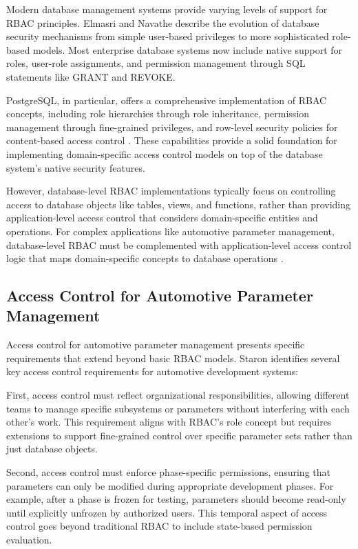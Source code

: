 Modern database management systems provide varying levels of support for RBAC principles. Elmasri and Navathe \cite{elmasri2015fundamentals} describe the evolution of database security mechanisms from simple user-based privileges to more sophisticated role-based models. Most enterprise database systems now include native support for roles, user-role assignments, and permission management through SQL statements like GRANT and REVOKE.

PostgreSQL, in particular, offers a comprehensive implementation of RBAC concepts, including role hierarchies through role inheritance, permission management through fine-grained privileges, and row-level security policies for content-based access control \cite{obe2017postgresql}. These capabilities provide a solid foundation for implementing domain-specific access control models on top of the database system's native security features.

However, database-level RBAC implementations typically focus on controlling access to database objects like tables, views, and functions, rather than providing application-level access control that considers domain-specific entities and operations. For complex applications like automotive parameter management, database-level RBAC must be complemented with application-level access control logic that maps domain-specific concepts to database operations \cite{ferraiolo2011policy}.

\subsection{Access Control for Automotive Parameter Management}
\label{subsec:access-control-parameter-management}

Access control for automotive parameter management presents specific requirements that extend beyond basic RBAC models. Staron \cite{staron2021automotive} identifies several key access control requirements for automotive development systems:

First, access control must reflect organizational responsibilities, allowing different teams to manage specific subsystems or parameters without interfering with each other's work. This requirement aligns with RBAC's role concept but requires extensions to support fine-grained control over specific parameter sets rather than just database objects.

Second, access control must enforce phase-specific permissions, ensuring that parameters can only be modified during appropriate development phases. For example, after a phase is frozen for testing, parameters should become read-only until explicitly unfrozen by authorized users. This temporal aspect of access control goes beyond traditional RBAC to include state-based permission evaluation.

